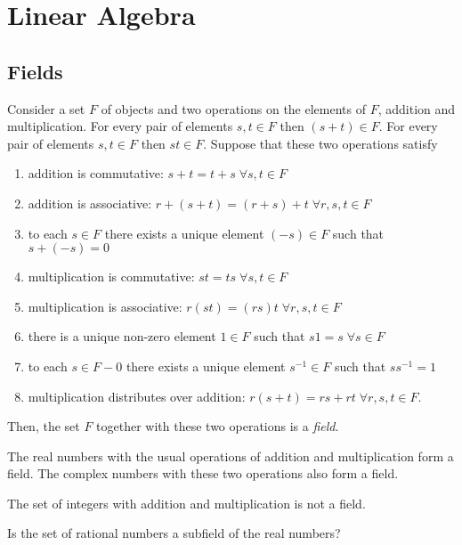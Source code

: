 \chapter{Linear Algebra}


\section{Fields}

Consider a set $F$ of objects and two operations on the elements of $F$, addition and multiplication.
For every pair of elements $s, t \in F$ then $(s + t) \in F$.
For every pair of elements $s, t \in F$ then $st \in F$.
Suppose that these two operations satisfy
\begin{enumerate}
\item addition is commutative: $s + t = t + s \; \forall s, t \in F$
\item addition is associative: $r + (s + t) = (r + s) + t \; \forall r, s, t \in F$
\item to each $s \in F$ there exists a unique element $(-s) \in F$ such that $s + (-s) = 0$
\item multiplication is commutative: $st = ts \; \forall s,t \in F$
\item multiplication is associative: $r(st) = (rs)t \; \forall r, s, t \in F$
\item there is a unique non-zero element $1 \in F$ such that $s1 = s \; \forall s \in F$
\item to each $s \in F - 0$ there exists a unique element $s^{-1} \in F$ such that $s s^{-1} = 1$
\item multiplication distributes over addition: $r (s + t) = rs + rt \; \forall r, s, t \in F$.
\end{enumerate}
Then, the set $F$ together with these two operations is a \emph{field}.

\begin{example}
The real numbers with the usual operations of addition and multiplication form a field.
The complex numbers with these two operations also form a field.
\end{example}

\begin{example}
The set of integers with addition and multiplication is not a field.
\end{example}

\begin{problem} \label{problem:RationalNumbers}
Is the set of rational numbers a subfield of the real numbers?
\end{problem}

